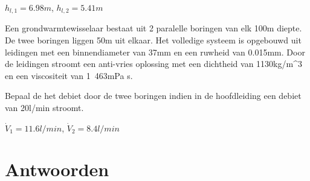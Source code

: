 \begin{antwoord}
	$h_{l,1} = \unit{6.98}{m}$, $h_{l,2} = \unit{5.41}{m}$
\end{antwoord}
\begin{toepassing}
	\label{grondwarmtewisselaar}
Een grondwarmtewisselaar bestaat uit 2 paralelle boringen van elk 100m diepte. De twee boringen liggen 50m uit elkaar. Het volledige systeem is opgebouwd uit leidingen met een binnendiameter van 37mm en een ruwheid van 0.015mm. Door de leidingen stroomt een anti-vries oplossing met een dichtheid van \unit{1130}{kg/m^3} en een viscositeit van \unit{1.463}{mPa s}.
	
	Bepaal de het debiet door de twee boringen indien in de hoofdleiding een debiet van \unit{20}{l/min} stroomt.
	\begin{center}
		
	\end{center}
\end{toepassing}
\begin{antwoord}
	$\dot{V}_{1} = \unit{11.6}{l/min}$, $\dot{V}_{2} = \unit{8.4}{l/min}$
\end{antwoord}
	\section*{Antwoorden}
\begin{multicols}{2}
\end{multicols}